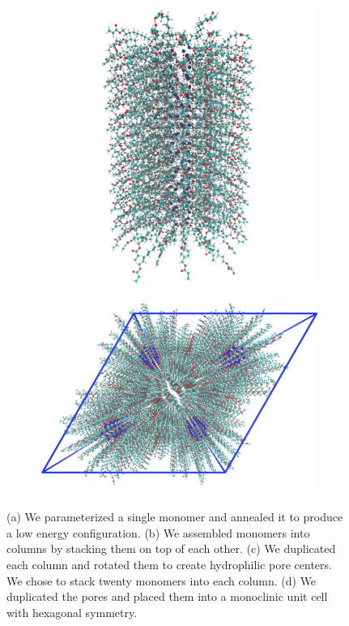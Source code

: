 \documentclass[journal=jpcbfk,manuscript=article]{achemso}
\begin{document}
\begin{figure}[!htb]
\begin{subfigure}[t]{0.42\textwidth}
  \caption{}
  \end{subfigure}
  \begin{subfigure}[t]{0.35\textwidth}
  \includegraphics[width=\linewidth]{initial_pore.pdf}
  \caption{}
  \end{subfigure}
  \begin{subfigure}[t]{0.45\textwidth}
  \includegraphics[width=\linewidth]{initial_unit_cell.pdf}
  \caption{}
  \end{subfigure}
  \caption{(a) We parameterized a single monomer and annealed it to produce a low energy
		configuration. (b) We assembled monomers into columns by stacking them on top of each 
		other. (c) We duplicated each column and rotated them to create hydrophilic pore centers.
		We chose to stack twenty monomers into each column. (d) We duplicated the pores and 
		placed them into a monoclinic unit cell with hexagonal symmetry.}\label{fig:build_procedure}
  \end{figure}
  
\end{document}
